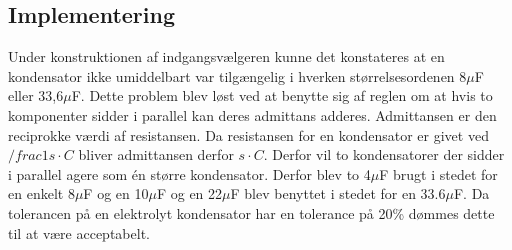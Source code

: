 \subsection{Implementering}
Under konstruktionen af indgangsvælgeren kunne det konstateres at en kondensator ikke umiddelbart var tilgængelig i hverken størrelsesordenen 8$\mu$F eller 33,6$\mu$F. Dette problem blev løst ved at benytte sig af reglen om at hvis to komponenter sidder i parallel kan deres admittans adderes. Admittansen er den reciprokke værdi af resistansen. Da resistansen for en kondensator er givet ved $/frac{1}{s\cdot C}$ bliver admittansen derfor $s\cdot C$. Derfor vil to kondensatorer der sidder i parallel agere som én større kondensator. Derfor blev to 4$\mu$F brugt i stedet for en enkelt 8$\mu$F og en 10$\mu$F og en 22$\mu$F blev benyttet i stedet for en 33.6$\mu$F. Da tolerancen på en elektrolyt kondensator har en tolerance på 20\%  dømmes dette til at være acceptabelt.
